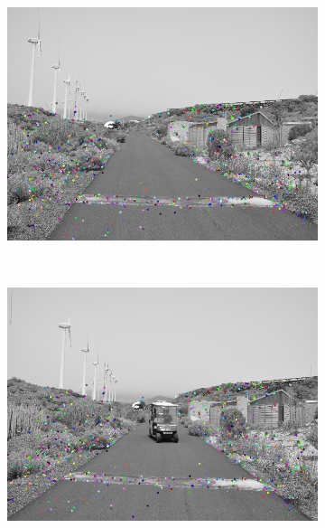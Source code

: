 \begin{figure}[h!]
\begin{subfigure}[b]{0.24\columnwidth}
	    \includegraphics[width=\textwidth]{pipeline2/fig2}\label{fig:pipelineB_1}
        \end{subfigure}%
        ~
        \begin{subfigure}[b]{0.24\columnwidth}
	    \includegraphics[width=\textwidth]{pipeline2/fig1}\label{fig:pipelineB_2}
        \end{subfigure}%
        ~
        \begin{subfigure}[b]{0.24\columnwidth}

\end{subfigure}
\end{figure}
